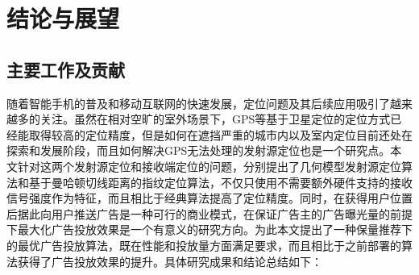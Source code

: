 \chapter{结论与展望}
\label{cha:conclusion}

\section{主要工作及贡献}

随着智能手机的普及和移动互联网的快速发展，定位问题及其后续应用吸引了越来越多的关注。虽然在相对空旷的室外场景下，GPS等基于卫星定位的定位方式已经能取得较高的定位精度，但是如何在遮挡严重的城市内以及室内定位目前还处在探索和发展阶段，而且如何解决GPS无法处理的发射源定位也是一个研究点。本文针对这两个发射源定位和接收端定位的问题，分别提出了几何模型发射源定位算法和基于曼哈顿切线距离的指纹定位算法，不仅只使用不需要额外硬件支持的接收信号强度作为特征，而且相比于经典算法提高了定位精度。同时，在获得用户位置后据此向用户推送广告是一种可行的商业模式，在保证广告主的广告曝光量的前提下最大化广告投放效果是一个有意义的研究方向。为此本文提出了一种保量推荐下的最优广告投放算法，既在性能和投放量方面满足要求，而且相比于之前部署的算法获得了广告投放效果的提升。具体研究成果和结论总结如下：
